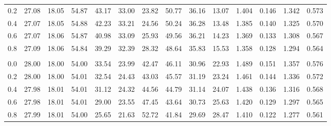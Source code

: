 \begin{table}[ht!]
\begin{tabular}{@{}cccccccccccccc@{}}
0.2 & 27.08 & 18.05 & 54.87 & 43.17 & 33.00 & 23.82 & 50.77 & 36.16 & 13.07 & 1.404 & 0.146 & 1.342 & 0.573 \\
0.4 & 27.07 & 18.05 & 54.88 & 42.23 & 33.21 & 24.56 & 50.24 & 36.28 & 13.48 & 1.385 & 0.140 & 1.325 & 0.570 \\
0.6 & 27.07 & 18.06 & 54.87 & 40.98 & 33.09 & 25.93 & 49.56 & 36.21 & 14.23 & 1.369 & 0.133 & 1.308 & 0.567 \\
0.8 & 27.09 & 18.06 & 54.84 & 39.29 & 32.39 & 28.32 & 48.64 & 35.83 & 15.53 & 1.358 & 0.128 & 1.294 & 0.564 \\
\addlinespace[4pt]
\multicolumn{14}{@{}l}{\textbf{S4: Binary + Continuous}}\\
0.0 & 28.00 & 18.00 & 54.00 & 33.54 & 23.99 & 42.47 & 46.11 & 30.96 & 22.93 & 1.489 & 0.151 & 1.357 & 0.576 \\
0.2 & 28.00 & 18.00 & 54.01 & 32.54 & 24.43 & 43.03 & 45.57 & 31.19 & 23.24 & 1.461 & 0.144 & 1.336 & 0.572 \\
0.4 & 27.98 & 18.01 & 54.01 & 31.12 & 24.32 & 44.56 & 44.79 & 31.14 & 24.07 & 1.438 & 0.136 & 1.316 & 0.568 \\
0.6 & 27.98 & 18.01 & 54.01 & 29.00 & 23.55 & 47.45 & 43.64 & 30.73 & 25.63 & 1.420 & 0.129 & 1.297 & 0.565 \\
0.8 & 27.99 & 18.01 & 54.00 & 25.65 & 21.63 & 52.72 & 41.84 & 29.69 & 28.47 & 1.410 & 0.122 & 1.277 & 0.561 \\
\bottomrule
\end{tabular}
\end{table}
